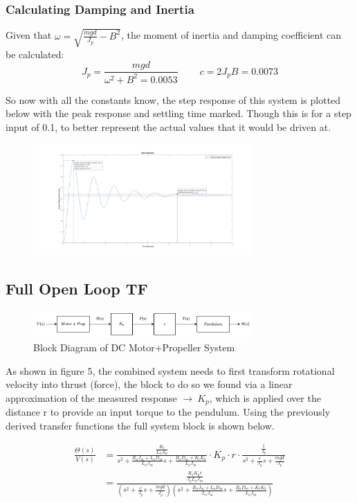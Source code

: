 \documentclass[a4paper,11pt]{article}
\begin{document}
\subsubsection{Calculating Damping and Inertia}
Given that $\omega = \sqrt{\frac{mgd}{J_p}-B^2}$, the moment of inertia and damping coefficient can be calculated:
$$J_p = \frac{mgd}{\omega^2 + B^2 = 0.0053}\;\;\;\;\;\;\;\;c = 2J_{p}B = 0.0073$$

So now with all the constants know, the step response of this system is plotted below with the peak response and settling time marked. Though this is for a step input of 0.1, to better represent the actual values that it would be driven at.
\begin{figure}[h]
        \centering
        \includegraphics[width=0.75\textwidth]{inc/pendulum.png}
        \caption{}
        \label{}
\end{figure}

\newpage
\subsection*{Full Open Loop TF}
\begin{figure}[h]
        \centering
        \includegraphics[width=0.75\textwidth]{inc/openloop_diagram.png}
        \caption{Block Diagram of DC Motor+Propeller System}
        \label{}
\end{figure}

As shown in figure 5, the combined system needs to first transform rotational velocity into thrust (force), the block to do so we found via a linear approximation of the measured response $\rightarrow\:K_p$, which is applied over the distance r to provide an input torque to the pendulum. Using the previously derived transfer functions the full system block is shown below.

\begin{align*}
        \frac{\Theta(s)}{V(s)} &= \frac{\frac{K_t}{L_aJ_m}}{s^2 + \frac{R_{a}J_{m} + L_{a}D_{m}}{L_{a}J_{m}}s + \frac{R_aD_m + K_tK_b}{L_aJ_m}} \cdot K_{p} \cdot r \cdot \frac{\frac{1}{J_{p}}}{s^{2} + \frac{c}{J_{p}}s + \frac{mgd}{J_{p}}} \\
        &= \frac{\frac{K_tK_pr}{J_pL_aJ_m}}{(s^2+\frac{c}{J_p}s+\frac{mgd}{J_p})(s^2+\frac{R_aJ_m+L_aD_m}{L_aJ_m}s+\frac{R_aD_m+K_tK_b}{L_aJ_m})}
\end{align*}
\end{document}
